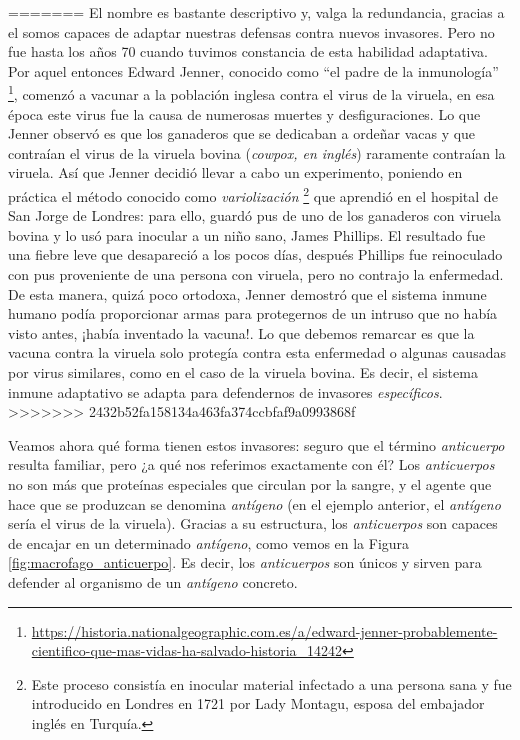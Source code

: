 =======
El nombre es bastante descriptivo y, valga la redundancia, gracias a el somos capaces de adaptar nuestras defensas contra nuevos invasores. Pero no fue hasta los años 70 cuando tuvimos constancia de esta habilidad adaptativa. Por aquel entonces Edward Jenner, conocido como ``el padre de la inmunología'' \footnote{\url{https://historia.nationalgeographic.com.es/a/edward-jenner-probablemente-cientifico-que-mas-vidas-ha-salvado-historia_14242}}, comenzó a vacunar a la población inglesa contra el virus de la viruela, en esa época este virus fue la causa de numerosas muertes y desfiguraciones. Lo que Jenner observó es que los ganaderos que se dedicaban a ordeñar vacas y que contraían el virus de la viruela bovina (\textit{cowpox, en inglés}) raramente contraían la viruela. Así que Jenner decidió llevar a cabo un experimento, poniendo en práctica el método conocido como \textit{variolización} \footnote{Este proceso consistía en inocular material infectado a una persona sana y fue introducido en Londres en 1721 por  Lady Montagu, esposa del embajador inglés en Turquía.} que aprendió en el hospital de San Jorge de Londres: para ello, guardó pus de uno de los ganaderos con viruela bovina y lo usó para inocular a un niño sano, James Phillips. El resultado fue una fiebre leve que desapareció a los pocos días, después Phillips fue reinoculado con pus proveniente de una persona con viruela, pero no contrajo la enfermedad. De esta manera, quizá poco ortodoxa, Jenner demostró que el sistema inmune humano podía proporcionar armas para protegernos de un intruso que no había visto antes, ¡había inventado la vacuna!. Lo que debemos remarcar es que la vacuna contra la viruela solo protegía contra esta enfermedad o algunas causadas por virus similares, como en el caso de la viruela bovina. Es decir, el sistema inmune adaptativo se adapta para defendernos de invasores \textit{específicos}. 
>>>>>>> 2432b52fa158134a463fa374ccbfaf9a0993868f

Veamos ahora qué forma tienen estos invasores: seguro que el término \textit{anticuerpo} resulta familiar, pero ¿a qué nos referimos exactamente con él? Los \textit{anticuerpos} no son más que proteínas especiales que circulan por la sangre, y el agente que hace que se produzcan se denomina \textit{antígeno} (en el ejemplo anterior, el \textit{antígeno} sería el virus de la viruela). Gracias a su estructura, los \textit{anticuerpos} son capaces de encajar en un determinado \textit{antígeno}, como vemos en la Figura \ref{fig:macrofago_anticuerpo}. Es decir, los \textit{anticuerpos} son únicos y sirven para defender al organismo de un \textit{antígeno} concreto.	

